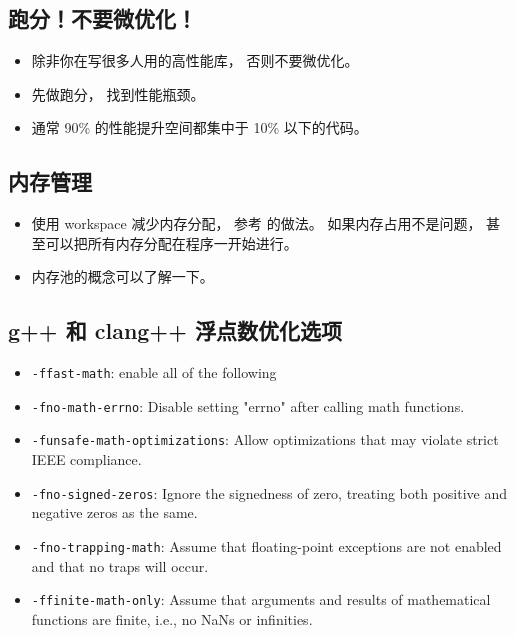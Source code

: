 
\begin{issues}
\issueDraft
\end{issues}


\subsection{跑分！不要微优化！}
\begin{itemize}
\item 除非你在写很多人用的高性能库， 否则不要微优化。
\item 先做跑分， 找到性能瓶颈。
\item 通常 90\% 的性能提升空间都集中于 10\% 以下的代码。
\end{itemize}


\subsection{内存管理}
\begin{itemize}
\item 使用 workspace 减少内存分配， 参考 的做法。 如果内存占用不是问题， 甚至可以把所有内存分配在程序一开始进行。
\item 内存池的概念可以了解一下。
\end{itemize}

\subsection{g++ 和 clang++ 浮点数优化选项}
\begin{itemize}
\item \verb`-ffast-math`: enable all of the following
\item \verb`-fno-math-errno`: Disable setting "errno" after calling math functions.
\item \verb`-funsafe-math-optimizations`: Allow optimizations that may violate strict IEEE compliance.
\item \verb`-fno-signed-zeros`: Ignore the signedness of zero, treating both positive and negative zeros as the same.
\item \verb`-fno-trapping-math`: Assume that floating-point exceptions are not enabled and that no traps will occur.
\item \verb`-ffinite-math-only`: Assume that arguments and results of mathematical functions are finite, i.e., no NaNs or infinities.
\end{itemize}
